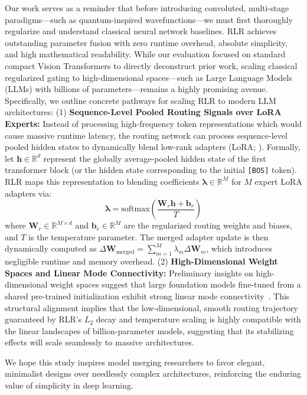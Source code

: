 Our work serves as a reminder that before introducing convoluted, multi-stage paradigms—such as quantum-inspired wavefunctions—we must first thoroughly regularize and understand classical neural network baselines. RLR achieves outstanding parameter fusion with zero runtime overhead, absolute simplicity, and high mathematical readability. While our evaluation focused on standard compact Vision Transformers to directly deconstruct prior work, scaling classical regularized gating to high-dimensional spaces---such as Large Language Models (LLMs) with billions of parameters---remains a highly promising avenue. Specifically, we outline concrete pathways for scaling RLR to modern LLM architectures: 
(1) \textbf{Sequence-Level Pooled Routing Signals over LoRA Experts:} Instead of processing high-frequency token representations which would cause massive runtime latency, the routing network can process sequence-level pooled hidden states to dynamically blend low-rank adapters (LoRA; \cite{Hu2022}). Formally, let $\mathbf{h} \in \mathbb{R}^d$ represent the globally average-pooled hidden state of the first transformer block (or the hidden state corresponding to the initial \texttt{[BOS]} token). RLR maps this representation to blending coefficients $\boldsymbol{\lambda} \in \mathbb{R}^M$ for $M$ expert LoRA adapters via:
\begin{equation}
\boldsymbol{\lambda} = \mathrm{softmax}\left( \frac{\mathbf{W}_r \mathbf{h} + \mathbf{b}_r}{T} \right)
\end{equation}
where $\mathbf{W}_r \in \mathbb{R}^{M \times d}$ and $\mathbf{b}_r \in \mathbb{R}^M$ are the regularized routing weights and biases, and $T$ is the temperature parameter. The merged adapter update is then dynamically computed as $\Delta \mathbf{W}_{\text{merged}} = \sum_{m=1}^M \lambda_m \Delta \mathbf{W}_m$, which introduces negligible runtime and memory overhead.
(2) \textbf{High-Dimensional Weight Spaces and Linear Mode Connectivity:} Preliminary insights on high-dimensional weight spaces suggest that large foundation models fine-tuned from a shared pre-trained initialization exhibit strong linear mode connectivity~\cite{Wortsman2022}. This structural alignment implies that the low-dimensional, smooth routing trajectory guaranteed by RLR's $L_2$ decay and temperature scaling is highly compatible with the linear landscapes of billion-parameter models, suggesting that its stabilizing effects will scale seamlessly to massive architectures.

We hope this study inspires model merging researchers to favor elegant, minimalist designs over needlessly complex architectures, reinforcing the enduring value of simplicity in deep learning.
